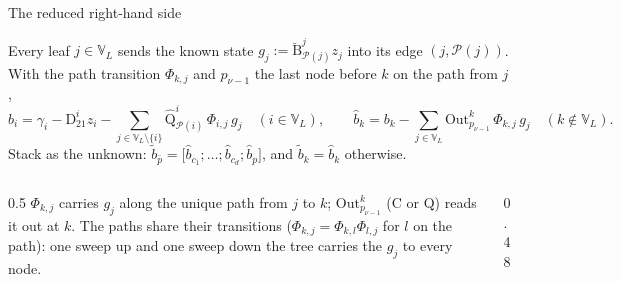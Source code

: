 \documentclass[aspectratio=169,11pt]{beamer}
\newcommand{\vblk}[5]{\fill[#4] (#1,#2) rectangle ++(6mm,-#3); \draw (#1,#2) rectangle ++(6mm,-#3);
  \node[font=\tiny] at ($(#1,#2)+(3mm,-0.5*#3)$) {#5};}
\begin{document}
\begin{frame}{The reduced right-hand side}
\footnotesize
\begin{definition}
\upshape
Every leaf $j\in\mathbb{V}_L$ sends the known state $g_j:=\breve{\mathrm{B}}^j_{\mathcal{P}(j)}z_j$ into its edge
$(j,\mathcal{P}(j))$. With the path transition $\Phi_{k,j}$ and $p_{\nu-1}$ the last node before $k$ on the path from $j$,
\[
\hat{b}_i=\gamma_i-\mathrm{D}^i_{21}z_i-\sum_{j\in\mathbb{V}_L\setminus\{i\}}\hat{\mathrm{Q}}^i_{\mathcal{P}(i)}\,
  \Phi_{i,j}\,g_j\quad(i\in\mathbb{V}_L),
\qquad
\hat{b}_k=b_k-\sum_{j\in\mathbb{V}_L}\mathrm{Out}^k_{p_{\nu-1}}\,
  \Phi_{k,j}\,g_j\quad(k\notin\mathbb{V}_L).
\]
Stack as the unknown: $\tilde{b}_{\bar{p}}=\bigl[\hat{b}_{c_1};\dots;\hat{b}_{c_d};\hat{b}_p\bigr]$, and $\tilde{b}_k=\hat{b}_k$ otherwise.
\end{definition}

\begin{columns}[c]
\begin{column}{0.5\textwidth}
\scriptsize
$\Phi_{k,j}$ carries $g_j$ along the unique path from $j$ to $k$; $\mathrm{Out}^k_{p_{\nu-1}}$ ($\mathrm{C}$ or $\mathrm{Q}$)
reads it out at $k$. The paths share their transitions ($\Phi_{k,j}=\Phi_{k,l}\Phi_{l,j}$ for $l$ on the path):
one sweep up and one sweep down the tree carries the $g_j$ to every node.
\end{column}
\begin{column}{0.48\textwidth}
\centering
{}
\end{column}
\end{columns}
\end{frame}
\end{document}
